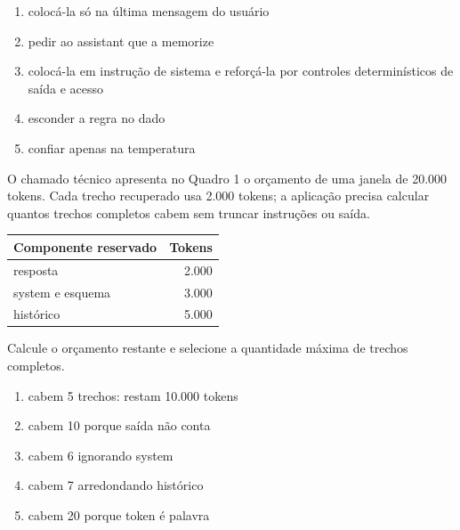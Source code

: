 \begin{enumerate}[label=\Alph*)]

\item colocá-la só na última mensagem do usuário

\item pedir ao assistant que a memorize

\item colocá-la em instrução de sistema e reforçá-la por controles determinísticos de saída e acesso

\item esconder a regra no dado

\item confiar apenas na temperatura

\end{enumerate}


\TextoBase

O chamado técnico apresenta no Quadro 1 o orçamento de uma janela de 20.000 tokens. Cada trecho recuperado usa 2.000 tokens; a aplicação precisa calcular quantos trechos completos cabem sem truncar instruções ou saída.
\begin{DocumentBox}
\begin{tabularx}{\textwidth}{@{}Yr@{}}\toprule
\textbf{Componente reservado} & \textbf{Tokens}\\\midrule
resposta & 2.000\\ system e esquema & 3.000\\ histórico & 5.000\\\bottomrule
\end{tabularx}
\end{DocumentBox}

\FonteDidatica

\Comando Calcule o orçamento restante e selecione a quantidade máxima de trechos completos.

\begin{enumerate}[label=\Alph*)]

\item cabem 5 trechos: restam 10.000 tokens

\item cabem 10 porque saída não conta

\item cabem 6 ignorando system

\item cabem 7 arredondando histórico

\item cabem 20 porque token é palavra

\end{enumerate}

